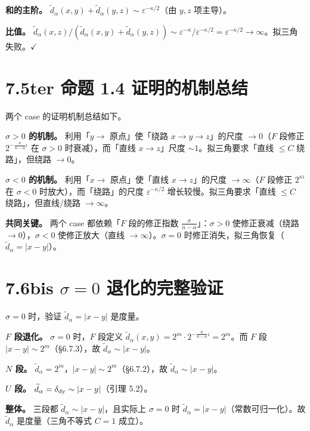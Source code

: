 \documentclass[a4paper,11pt,openany]{ctexbook}
\numberwithin{equation}{chapter}
\numberwithin{figure}{chapter}
\numberwithin{table}{chapter}
\begin{document}
\textbf{和的主阶。} $\widetilde d_\alpha(x,y)+\widetilde d_\alpha(y,z)\sim\varepsilon^{-\kappa/2}$（由 $y,z$ 项主导）。

\textbf{比值。} $\widetilde d_\alpha(x,z)/(\widetilde d_\alpha(x,y)+\widetilde d_\alpha(y,z))\sim\varepsilon^{-\kappa}/\varepsilon^{-\kappa/2}=\varepsilon^{-\kappa/2}\to\infty$。拟三角失败。$\checkmark$

\section{7.5ter 命题 1.4 证明的机制总结}

两个 case 的证明机制总结如下。

\textbf{$\sigma>0$ 的机制。} 利用「$y\to$ 原点」使「绕路 $x\to y\to z$」的尺度 $\to0$（$F$ 段修正 $2^{-\frac{\sigma}{n-\alpha}\iota}$ 在 $\sigma>0$ 时衰减），而「直线 $x\to z$」尺度 $\sim1$。拟三角要求「直线 $\le C$ 绕路」，但绕路 $\to0$。

\textbf{$\sigma<0$ 的机制。} 利用「$x\to$ 原点」使「直线 $x\to z$」的尺度 $\to\infty$（$F$ 段修正 $2^{\kappa\iota}$ 在 $\sigma<0$ 时放大），而「绕路」的尺度 $\varepsilon^{-\kappa/2}$ 增长较慢。拟三角要求「直线 $\le C$ 绕路」，但直线/绕路 $\to\infty$。

\textbf{共同关键。} 两个 case 都依赖「$F$ 段的修正指数 $\frac{\sigma}{n-\alpha}$」：$\sigma>0$ 使修正衰减（绕路 $\to0$），$\sigma<0$ 使修正放大（直线 $\to\infty$）。$\sigma=0$ 时修正消失，拟三角恢复（$\widetilde d_\alpha=|x-y|$）。

\section{7.6bis $\sigma=0$ 退化的完整验证}

$\sigma=0$ 时，验证 $\widetilde d_\alpha=|x-y|$ 是度量。

\textbf{$F$ 段退化。} $\sigma=0$ 时，$F$ 段定义 $\widetilde d_\alpha(x,y)=2^{m}\cdot2^{-\frac{0}{n-\alpha}\iota}=2^{m}$。而 $F$ 段 $|x-y|\sim2^{m}$（§6.7.3），故 $\widetilde d_\alpha\sim|x-y|$。

\textbf{$N$ 段。} $\widetilde d_\alpha=2^{m}$，$|x-y|\sim2^{m}$（§6.7.2），故 $\widetilde d_\alpha\sim|x-y|$。

\textbf{$U$ 段。} $\widetilde d_\alpha=\delta_{\rm dy}\sim|x-y|$（引理 5.2）。

\textbf{整体。} 三段都 $\widetilde d_\alpha\sim|x-y|$，且实际上 $\sigma=0$ 时 $\widetilde d_\alpha=|x-y|$（常数可归一化）。故 $\widetilde d_\alpha$ 是度量（三角不等式 $C=1$ 成立）。
\end{document}
